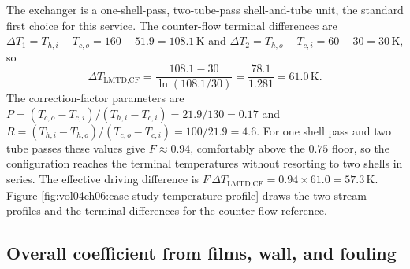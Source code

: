 The exchanger is a one-shell-pass, two-tube-pass shell-and-tube unit,
the standard first choice for this service. The counter-flow terminal
differences are $\Delta T_1 = T_{h,i} - T_{c,o} = 160 - 51.9 = 108.1\,
\si{\kelvin}$ and $\Delta T_2 = T_{h,o} - T_{c,i} = 60 - 30 = 30\,
\si{\kelvin}$, so
\[
\Delta T_{\text{LMTD,CF}} = \frac{108.1 - 30}{\ln(108.1/30)} = \frac{
78.1}{1.281} = 61.0\,\si{\kelvin}.
\]
The correction-factor parameters are $P = (T_{c,o} - T_{c,i})/(T_{h,i} -
T_{c,i}) = 21.9/130 = 0.17$ and $R = (T_{h,i} - T_{h,o})/(T_{c,o} -
T_{c,i}) = 100/21.9 = 4.6$. For one shell pass and two tube passes these
values give $F \approx 0.94$, comfortably above the $0.75$ floor, so the
configuration reaches the terminal temperatures without resorting to two
shells in series. The effective driving difference is $F\,\Delta
T_{\text{LMTD,CF}} = 0.94 \times 61.0 = 57.3\,\si{\kelvin}$. Figure
\ref{fig:vol04ch06:case-study-temperature-profile} draws the two
stream profiles and the terminal differences for the counter-flow
reference.



\subsection{Overall coefficient from films, wall, and fouling}

